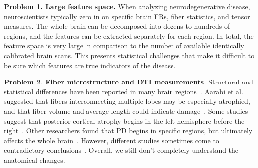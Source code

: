 \noindent\textbf{Problem 1. Large feature space.}
When analyzing neurodegenerative disease, neuroscientists typically zero in on specific brain FRs, fiber statistics, and tensor measures. 
The whole brain
can be decomposed into dozens to hundreds of 
regions, 
and the features can be extracted 
separately
for each region. In total, the feature space is very large in  
comparison to the number of available identically calibrated brain scans.
This presents statistical challenges that make it difficult to be sure which features are true indicators of the disease.

\vspace{1pt}
\noindent\textbf{Problem 2. Fiber microstructure and DTI measurements.}
Structural and statistical differences 
have been reported in many brain regions~\cite{zhang2015diffusion, aarabi2015statistical,wei2016combined}. Aarabi et al. suggested that fibers interconnecting multiple lobes may be 
especially atrophied, and that fiber volume and average 
length could %
indicate damage~\cite{aarabi2015statistical}. Some studies
suggest that posterior cortical atrophy begins in the left hemisphere before the right~\cite{claassen2016cortical}. 
Other researchers found that PD %
begins in specific regions, but ultimately affects the whole brain~\cite{olde2013disrupted,yau2018network}.
However, different studies sometimes come to contradictory conclusions~\cite{zhang2015diffusion, wen2016white}. Overall, we still don't completely understand the anatomical changes.


